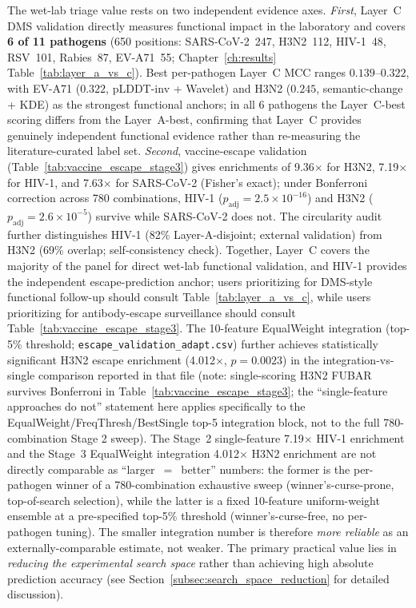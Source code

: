 The wet-lab triage value rests on two independent evidence axes. \emph{First}, Layer~C DMS validation directly measures functional impact in the laboratory and covers \textbf{6 of 11 pathogens} (650 positions: SARS-CoV-2~247, H3N2~112, HIV-1~48, RSV~101, Rabies~87, EV-A71~55; Chapter~\ref{ch:results} Table~\ref{tab:layer_a_vs_c}). Best per-pathogen Layer~C MCC ranges $0.139$--$0.322$, with EV-A71 ($0.322$, pLDDT-inv + Wavelet) and H3N2 ($0.245$, semantic-change + KDE) as the strongest functional anchors; in all 6 pathogens the Layer~C-best scoring differs from the Layer~A-best, confirming that Layer~C provides genuinely independent functional evidence rather than re-measuring the literature-curated label set. \emph{Second}, vaccine-escape validation (Table~\ref{tab:vaccine_escape_stage3}) gives enrichments of 9.36$\times$ for H3N2, 7.19$\times$ for HIV-1, and 7.63$\times$ for SARS-CoV-2 (Fisher's exact); under Bonferroni correction across 780 combinations, HIV-1 ($p_{\text{adj}} = 2.5 \times 10^{-16}$) and H3N2 ($p_{\text{adj}} = 2.6 \times 10^{-5}$) survive while SARS-CoV-2 does not. The circularity audit further distinguishes HIV-1 (82\% Layer-A-disjoint; external validation) from H3N2 (69\% overlap; self-consistency check). Together, Layer~C covers the majority of the panel for direct wet-lab functional validation, and HIV-1 provides the independent escape-prediction anchor; users prioritizing for DMS-style functional follow-up should consult Table~\ref{tab:layer_a_vs_c}, while users prioritizing for antibody-escape surveillance should consult Table~\ref{tab:vaccine_escape_stage3}.
The 10-feature EqualWeight integration (top-5\% threshold; \texttt{escape\_validation\_adapt.csv}) further achieves statistically significant H3N2 escape enrichment (4.012$\times$, $p = 0.0023$) in the integration-vs-single comparison reported in that file (note: single-scoring H3N2 FUBAR survives Bonferroni in Table~\ref{tab:vaccine_escape_stage3}; the ``single-feature approaches do not'' statement here applies specifically to the EqualWeight/FreqThresh/BestSingle top-5 integration block, not to the full 780-combination Stage 2 sweep). The Stage~2 single-feature 7.19$\times$ HIV-1 enrichment and the Stage~3 EqualWeight integration 4.012$\times$ H3N2 enrichment are not directly comparable as ``larger~$=$~better'' numbers: the former is the per-pathogen winner of a 780-combination exhaustive sweep (winner's-curse-prone, top-of-search selection), while the latter is a fixed 10-feature uniform-weight ensemble at a pre-specified top-5\% threshold (winner's-curse-free, no per-pathogen tuning). The smaller integration number is therefore \emph{more reliable} as an externally-comparable estimate, not weaker. The primary practical value lies in \textit{reducing the experimental search space} rather than achieving high absolute prediction accuracy (see Section~\ref{subsec:search_space_reduction} for detailed discussion).

